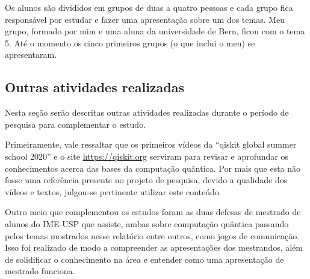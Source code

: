 \documentclass{article}
\begin{document}
            
        Os alunos são divididos em grupos de duas a quatro pessoas e cada grupo fica responsável por estudar e fazer uma apresentação sobre um dos temas. Meu grupo, formado por mim e uma aluna da universidade de Bern, ficou com o tema 5. Até o momento os cinco primeiros grupos (o que inclui o meu) se apresentaram.






    \subsection{Outras atividades realizadas}
        Nesta seção serão descritas outras atividades realizadas durante o período de pesquisa para complementar o estudo.

        Primeiramente, vale ressaltar que os primeiros vídeos da ``qiskit global summer school 2020'' e o site \href{https://qiskit.org}{https://qiskit.org} serviram para revisar e aprofundar os conhecimentos acerca das bases da computação quântica. Por mais que esta não fosse uma referência presente no projeto de pesquisa, devido a qualidade dos vídeos e textos, julgou-se pertinente utilizar este conteúdo. 

        Outro meio que complementou os estudos foram as duas defesas de mestrado de alunos do IME-USP que assiste, ambas sobre computação quântica passando pelos temas mostrados nesse relatório entre outros, como jogos de comunicação. Isso foi realizado de modo a compreender as apresentações dos mestrandos, além de solidificar o conhecimento na área e entender como uma apresentação de mestrado funciona.
\end{document}
